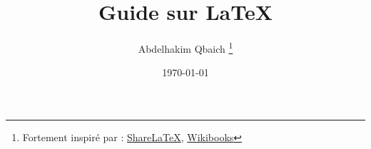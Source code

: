 \documentclass[12pt]{article}
\title{Guide sur \LaTeX}
\author{
  Abdelhakim Qbaich
  \thanks{Fortement inspiré par :
    \href{https://www.sharelatex.com/learn}{ShareLaTeX},
    \href{https://en.wikibooks.org/wiki/LaTeX}{Wikibooks}
  }
}
\date{\today}
\begin{document}
\begin{titlepage}
  \maketitle
  \tableofcontents
\end{titlepage}






\end{document}
